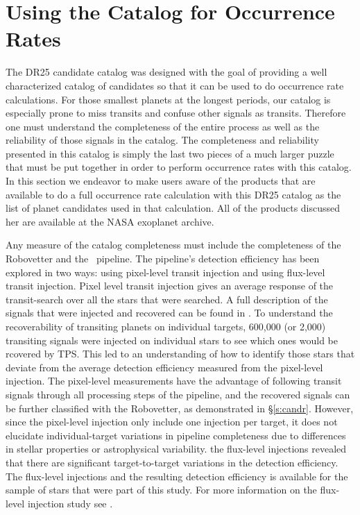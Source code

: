 \section{Using the Catalog for Occurrence Rates}

The DR25 candidate catalog was designed with the goal of providing a well characterized catalog of candidates so that it can be used to do occurrence rate calculations.  For those smallest planets at the longest periods, our catalog is especially prone to miss transits and confuse other signals as transits.  Therefore one must understand the completeness of the entire process as well as the reliability of those signals in the catalog.  The completeness and reliability presented in this catalog is simply the last two pieces of a much larger puzzle that must be put together in order to perform occurrence rates with this catalog.  In this section we endeavor to make users aware of the products that are available to do a full occurrence rate calculation with this DR25 catalog as the list of planet candidates used in that calculation. All of the products discussed her are available at the NASA exoplanet archive. 

Any measure of the catalog completeness must include the completeness of the Robovetter and the \Kepler\ pipeline.  The pipeline's detection efficiency has been explored in two ways: using pixel-level transit injection and using flux-level transit injection.  Pixel level transit injection gives an average response of the transit-search over all the stars that were searched. A full description of the signals that were injected and recovered can be found in \citet{KSCI19111}.  To understand the recoverability of transiting planets on individual targets, 600,000 (or 2,000) transiting signals were injected on individual stars to see which ones would be rcovered by TPS.  This led to an understanding of how to identify those stars that deviate from the average detection efficiency measured from the pixel-level injection.  The pixel-level measurements have the advantage of following transit signals through all processing steps of the \Kepler{} pipeline, and the recovered signals can be further classified with the Robovetter, as demonstrated in \S\ref{s:candr}.  However, since the pixel-level injection only include one injection per target, it does not elucidate individual-target variations in pipeline completeness due to differences in stellar properties or astrophysical variability. the flux-level injections revealed  that  there  are  significant target-to-target variations in the detection efficiency. The flux-level injections and the resulting detection efficiency is available for the sample of stars that were part of this study. For more information on the flux-level injection study see \citet{KSCI19109}. 


